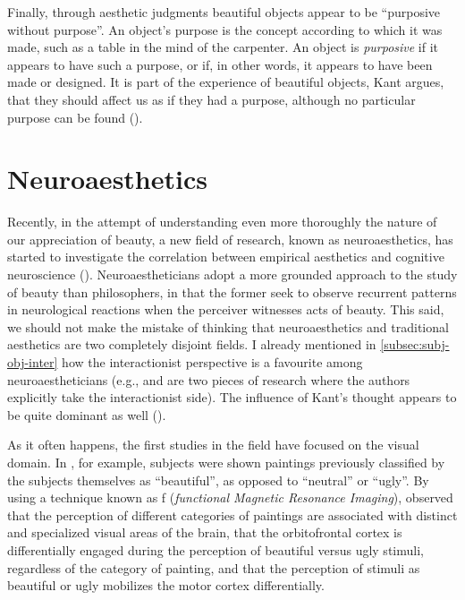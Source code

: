 Finally, through aesthetic judgments beautiful objects appear to be ``purposive without purpose''. An object's purpose is the concept according to which it was made, such as a table in the mind of the carpenter. An object is \emph{purposive} if it appears to have such a purpose, or if, in other words, it appears to have been made or designed. It is part of the experience of beautiful objects, Kant argues, that they should affect us as if they had a purpose, although no particular purpose can be found (\cite{kant2001critique}).

\section{Neuroaesthetics}\label{sec:neuroaesthetics}
Recently, in the attempt of understanding even more thoroughly the nature of our appreciation of beauty, a new field of research, known as neuroaesthetics, has started to investigate the correlation between empirical aesthetics and cognitive neuroscience (\cite{pearce2016neuroaesthetics}). Neuroaestheticians adopt a more grounded approach to the study of beauty than philosophers, in that the former seek to observe recurrent patterns in neurological reactions when the perceiver witnesses acts of beauty. This said, we should not make the mistake of thinking that neuroaesthetics and traditional aesthetics are two completely disjoint fields. I  already mentioned in \autoref{subsec:subj-obj-inter} how the interactionist perspective is a favourite among neuroaestheticians (e.g., \cite{juslin2013everyday} and \cite{reber2004processing} are two pieces of research where the authors explicitly take the interactionist side). The influence of Kant's thought appears to be quite dominant as well (\cite{conway2013neuroaesthetics}).

As it often happens, the first studies in the field have focused on the visual domain. In \cite{kawabata2004neural}, for example, subjects were shown paintings previously classified by the subjects themselves as ``beautiful'', as opposed to ``neutral'' or ``ugly''. By using a technique known as f (\emph{functional Magnetic Resonance Imaging}), \citeauthor{kawabata2004neural} observed that the perception of different categories of paintings are associated with distinct and specialized visual areas of the brain, that the orbitofrontal cortex is differentially engaged during the perception of beautiful versus ugly stimuli, regardless of the category of painting, and that the perception of stimuli as beautiful or ugly mobilizes the motor cortex differentially. 

